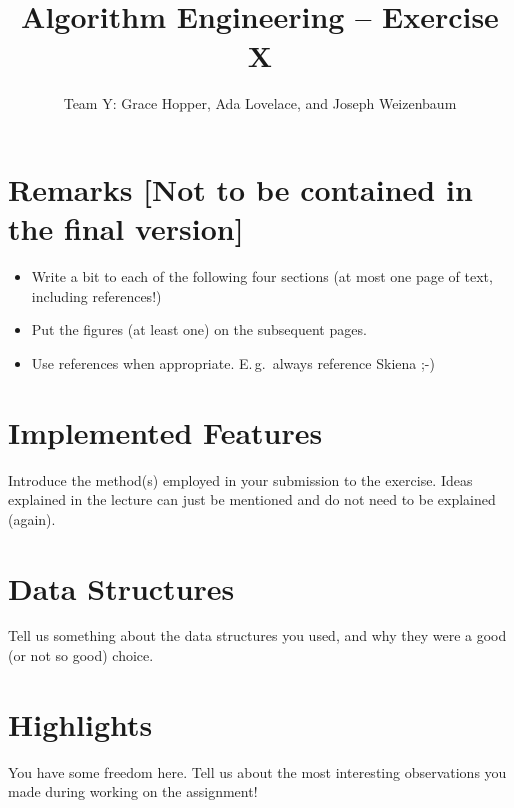 \documentclass[5p,twocolumn,final]{elsarticle}
\begin{document}
\begin{frontmatter}
	\title{Algorithm Engineering -- Exercise X}
	\author{Team Y: Grace Hopper, Ada Lovelace, and Joseph Weizenbaum}
\end{frontmatter}

\linenumbers
\section*{Remarks [Not to be contained in the final version]}
\begin{itemize}
	\item Write a bit to each of the following four sections (at most one page of text, including references!)
	\item Put the figures (at least one) on the subsequent pages.
	\item Use references when appropriate. E.\,g.\ always reference Skiena \cite{skiena1998} ;-)
\end{itemize}

\section{Implemented Features}
Introduce the method(s) employed in your submission to the exercise.
Ideas explained in the lecture can just be mentioned and do not need to be explained (again).

\section{Data Structures}
Tell us something about the data structures you used, and why they were a good (or not so good) choice.

\section{Highlights}
You have some freedom here.
Tell us about the most interesting observations you made during working on the assignment!
\end{document}
